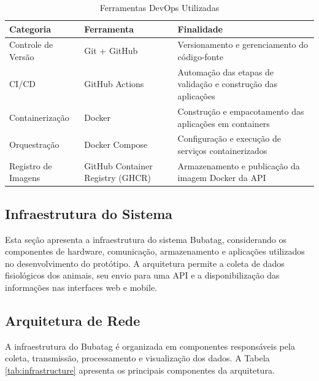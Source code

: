 \documentclass[11pt,a4paper]{article}
\begin{document}
\begin{table}[H]
\centering
\caption{Ferramentas DevOps Utilizadas}
\label{tab:devops-tools}
\begin{tabular}{|l|l|p{6cm}|}
\hline
\textbf{Categoria} & \textbf{Ferramenta} & \textbf{Finalidade} \\
\hline
Controle de Versão & Git + GitHub & Versionamento e gerenciamento do código-fonte \\
CI/CD & GitHub Actions & Automação das etapas de validação e construção das aplicações \\
Containerização & Docker & Construção e empacotamento das aplicações em containers \\
Orquestração & Docker Compose & Configuração e execução de serviços containerizados \\
Registro de Imagens & GitHub Container Registry (GHCR) & Armazenamento e publicação da imagem Docker da API \\
\hline
\end{tabular}
\end{table}

\subsection{Infraestrutura do Sistema}

Esta seção apresenta a infraestrutura do sistema Bubatag, considerando os componentes de hardware, comunicação, armazenamento e aplicações utilizados no desenvolvimento do protótipo. A arquitetura permite a coleta de dados fisiológicos dos animais, seu envio para uma API e a disponibilização das informações nas interfaces web e mobile.

\subsection{Arquitetura de Rede}

A infraestrutura do Bubatag é organizada em componentes responsáveis pela coleta, transmissão, processamento e visualização dos dados. A Tabela \ref{tab:infrastructure} apresenta os principais componentes da arquitetura.
\end{document}
